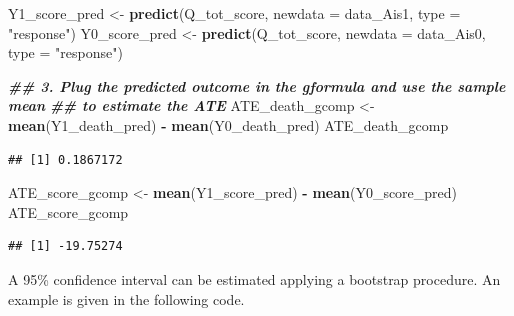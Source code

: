 \documentclass[
]{book}
\newenvironment{Shaded}{\begin{snugshade}}{\end{snugshade}}
\newcommand{\AttributeTok}[1]{\textcolor[rgb]{0.13,0.29,0.53}{#1}}
\newcommand{\DocumentationTok}[1]{\textcolor[rgb]{0.56,0.35,0.01}{\textbf{\textit{#1}}}}
\newcommand{\FunctionTok}[1]{\textcolor[rgb]{0.13,0.29,0.53}{\textbf{#1}}}
\newcommand{\NormalTok}[1]{#1}
\newcommand{\OtherTok}[1]{\textcolor[rgb]{0.56,0.35,0.01}{#1}}
\newcommand{\SpecialCharTok}[1]{\textcolor[rgb]{0.81,0.36,0.00}{\textbf{#1}}}
\newcommand{\StringTok}[1]{\textcolor[rgb]{0.31,0.60,0.02}{#1}}
\begin{document}
\begin{Shaded}
\begin{Highlighting}[]
\NormalTok{Y1\_score\_pred }\OtherTok{\textless{}{-}} \FunctionTok{predict}\NormalTok{(Q\_tot\_score, }\AttributeTok{newdata =}\NormalTok{ data\_Ais1, }\AttributeTok{type =} \StringTok{"response"}\NormalTok{)}
\NormalTok{Y0\_score\_pred }\OtherTok{\textless{}{-}} \FunctionTok{predict}\NormalTok{(Q\_tot\_score, }\AttributeTok{newdata =}\NormalTok{ data\_Ais0, }\AttributeTok{type =} \StringTok{"response"}\NormalTok{)}

\DocumentationTok{\#\# 3. Plug the predicted outcome in the gformula and use the sample mean }
\DocumentationTok{\#\#    to estimate the ATE}
\NormalTok{ATE\_death\_gcomp }\OtherTok{\textless{}{-}} \FunctionTok{mean}\NormalTok{(Y1\_death\_pred) }\SpecialCharTok{{-}} \FunctionTok{mean}\NormalTok{(Y0\_death\_pred)}
\NormalTok{ATE\_death\_gcomp}
\end{Highlighting}
\end{Shaded}

\begin{verbatim}
## [1] 0.1867172
\end{verbatim}

\begin{Shaded}
\begin{Highlighting}[]
\NormalTok{ATE\_score\_gcomp }\OtherTok{\textless{}{-}} \FunctionTok{mean}\NormalTok{(Y1\_score\_pred) }\SpecialCharTok{{-}} \FunctionTok{mean}\NormalTok{(Y0\_score\_pred)}
\NormalTok{ATE\_score\_gcomp}
\end{Highlighting}
\end{Shaded}

\begin{verbatim}
## [1] -19.75274
\end{verbatim}

A 95\% confidence interval can be estimated applying a bootstrap procedure. An example is given in the following code.
\end{document}
